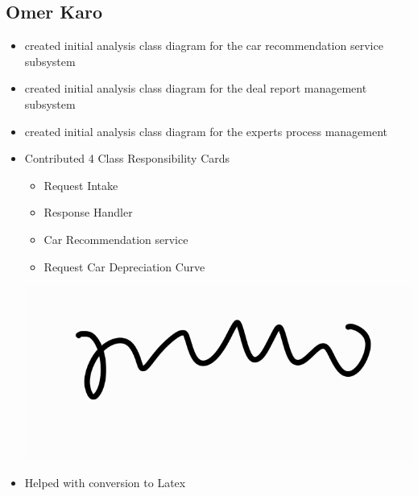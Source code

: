 \documentclass[]{article}
\begin{document}
\subsection{Omer Karo}
\begin{itemize}
    \item created initial analysis class diagram for the car recommendation service subsystem
    \item created initial analysis class diagram for the deal report management subsystem
    \item created initial analysis class diagram for the experts process management
    \item Contributed 4 Class Responsibility Cards
    \begin{itemize}
        \item Request Intake
        \item Response Handler
        \item Car Recommendation service
        \item Request Car Depreciation Curve 
    \end{itemize}
    \begin{center}
        \includegraphics[scale=0.1]{omer.jpg}
    \end{center}
    \item Helped with conversion to Latex
\end{itemize}
\end{document}
